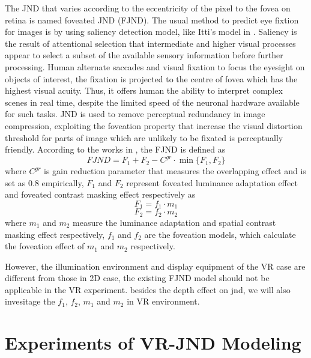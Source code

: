 \documentclass[journal]{IEEEtran}
\begin{document}
The JND that varies according to the eccentricity of the pixel to the fovea on retina is named foveated JND (FJND). The usual method to predict eye fixtion for images is by using saliency detection model, like Itti's model in \cite{RN14}. Saliency is the result of attentional selection that intermediate and higher visual processes appear to select a subset of the available sensory information before further processing.
Human alternate saccades and visual fixation to focus the eyesight on objects of interest, the fixation is projected to the centre of fovea which has the highest visual acuity. Thus, it offers human the ability to interpret complex scenes in real time, despite the limited speed of the neuronal hardware available for such tasks. JND is used to remove perceptual redundancy in image compression, exploiting the foveation property that increase the visual distortion threshold for parts of image which are unlikely to be fixated is perceptually friendly. 
According to the works in \cite{RN635, RN633}, the FJND is defined as
\begin{equation}
FJND=F_1+F_2-C^{gr}\cdot \min \{F_1, F_2 \}
\label{eq1}
\end{equation}
where $C^{gr}$ is gain reduction parameter that measures the overlapping effect and is set as 0.8 empirically, $F_1$ and $F_2$ represent foveated luminance adaptation effect and foveated contrast masking effect respectively as
\begin{equation}
F_1=f_1\cdot m_1
\label{eq2}
\end{equation}
\begin{equation}
F_2=f_2\cdot m_2
\label{eq3}
\end{equation}
where $m_1$ and $m_2$ measure the luminance adaptation and spatial contrast masking effect respectively, $f_1$ and $f_2$ are the foveation models, which calculate the foveation effect of $m_1$ and $m_2$ respectively. 

However, the illumination environment and display equipment of the VR case are different from those in 2D case, the existing FJND model should not be applicable in the VR experiment. besides the depth effect on jnd, we will also invesitage the $f_1$, $f_2$, $m_1$ and $m_2$ in VR environment.

\section{Experiments of VR-JND Modeling}
\end{document}
